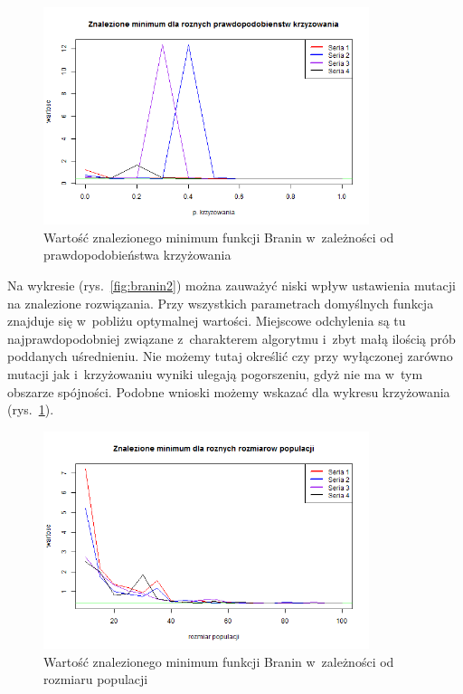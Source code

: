 \documentclass[11pt, a4paper]{article}
\newcommand{\fbi}{\leavevmode{\parindent=1em\indent}}
\begin{document}
\begin{figure}[H]
	\centering
	\includegraphics[width=0.85\textwidth]{./assets/Branin3.png}
	\caption{Wartość znalezionego minimum funkcji Branin w~zależności od prawdopodobieństwa krzyżowania}
	\label{fig:branin3}
\end{figure}

\fbi
Na wykresie (rys.~\ref{fig:branin2}) można zauważyć niski wpływ ustawienia mutacji na znalezione rozwiązania. Przy wszystkich parametrach domyślnych funkcja znajduje się w~pobliżu optymalnej wartości. Miejscowe odchylenia są tu najprawdopodobniej związane z~charakterem algorytmu i~zbyt małą ilością prób poddanych uśrednieniu. Nie możemy tutaj określić czy przy wyłączonej zarówno mutacji jak i~krzyżowaniu wyniki ulegają pogorszeniu, gdyż nie ma w~tym obszarze spójności. Podobne wnioski możemy wskazać dla wykresu krzyżowania (rys.~\ref{fig:branin3}).

\begin{figure}[H]
	\centering
	\includegraphics[width=0.85\textwidth]{./assets/Branin4.png}
	\caption{Wartość znalezionego minimum funkcji Branin w~zależności od rozmiaru populacji}
	\label{fig:branin4}
\end{figure}
\end{document}
